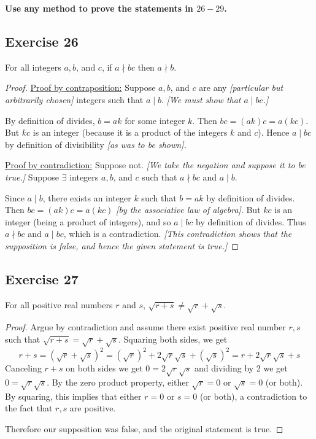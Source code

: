 \documentclass[14pt]{extarticle}
\newcommand{\te}{\exists}
\newcommand{\cy}{\color{cyan}}
\begin{document}
{\bf \cy Use any method to prove the statements in $26-29$.}

\subsection{Exercise 26}
For all integers $a, b$, and $c$, if $a \nmid bc$ then $a \nmid b$.

\begin{proof}
\underline{Proof by contraposition:} Suppose $a, b$, and $c$ are any {\it [particular but arbitrarily chosen]} integers such that $a \mid b$. {\it [We must show that $a \mid bc$.]} 

By definition of divides, $b = ak$ for some integer $k$. Then $bc = (ak)c = a(kc)$. But $kc$ is an integer (because it is a product of the integers $k$ and $c$). Hence $a \mid bc$ by definition of divisibility {\it [as was to be shown].}

\underline{Proof by contradiction:} Suppose not. {\it [We take the negation and suppose it to be true.]} Suppose $\te$ integers $a, b$, and $c$ such that $a \nmid bc$ and $a \mid b$. 

Since $a \mid b$, there exists an integer $k$ such that $b = ak$ by definition of divides. Then $bc = (ak)c = a(kc)$ {\it [by the associative law of algebra]}. But $kc$ is an integer (being a product of integers), and so $a \mid bc$ by definition of divides. Thus $a \nmid bc$ and $a \mid bc$, which is a contradiction. {\it [This contradiction shows that the supposition is false, and hence the given statement is true.]}
\end{proof}

\subsection{Exercise 27}
For all positive real numbers $r$ and $s$, $\sqrt{r+s} \neq \sqrt{r}+\sqrt{s}$.

\begin{proof}
Argue by contradiction and assume there exist positive real number $r,s$ such that $\sqrt{r+s} = \sqrt{r}+\sqrt{s}$. Squaring both sides, we get 
\[
r+s = (\sqrt{r}+\sqrt{s})^2 = (\sqrt{r})^2 + 2\sqrt{r}\sqrt{s} + (\sqrt{s})^2 = r + 2\sqrt{r}\sqrt{s} + s
\]
Canceling $r+s$ on both sides we get $0 = 2\sqrt{r}\sqrt{s}$ and dividing by 2 we get $0 = \sqrt{r}\sqrt{s}$. By the zero product property, either $\sqrt{r} = 0$ or $\sqrt{s} = 0$ (or both). By squaring, this implies that either $r = 0$ or $s = 0$ (or both), a contradiction to the fact that $r,s$ are positive.

Therefore our supposition was false, and the original statement is true.
\end{proof}
\end{document}
